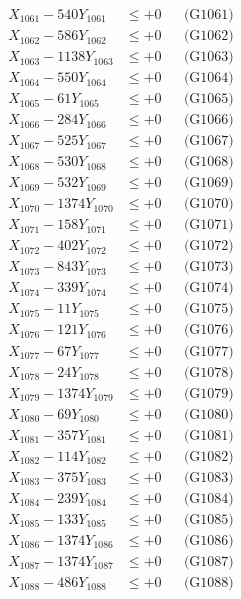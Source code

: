 \documentclass[a4paper,10pt]{article}
\begin{document}
{\begin{align}
\allowbreak
X_{1061} - 540Y_{1061} &\leq +0 && \text{(G1061)} \\
X_{1062} - 586Y_{1062} &\leq +0 && \text{(G1062)} \\
X_{1063} - 1138Y_{1063} &\leq +0 && \text{(G1063)} \\
X_{1064} - 550Y_{1064} &\leq +0 && \text{(G1064)} \\
X_{1065} - 61Y_{1065} &\leq +0 && \text{(G1065)} \\
X_{1066} - 284Y_{1066} &\leq +0 && \text{(G1066)} \\
X_{1067} - 525Y_{1067} &\leq +0 && \text{(G1067)} \\
X_{1068} - 530Y_{1068} &\leq +0 && \text{(G1068)} \\
X_{1069} - 532Y_{1069} &\leq +0 && \text{(G1069)} \\
X_{1070} - 1374Y_{1070} &\leq +0 && \text{(G1070)} \\
\allowbreak
X_{1071} - 158Y_{1071} &\leq +0 && \text{(G1071)} \\
X_{1072} - 402Y_{1072} &\leq +0 && \text{(G1072)} \\
X_{1073} - 843Y_{1073} &\leq +0 && \text{(G1073)} \\
X_{1074} - 339Y_{1074} &\leq +0 && \text{(G1074)} \\
X_{1075} - 11Y_{1075} &\leq +0 && \text{(G1075)} \\
X_{1076} - 121Y_{1076} &\leq +0 && \text{(G1076)} \\
X_{1077} - 67Y_{1077} &\leq +0 && \text{(G1077)} \\
X_{1078} - 24Y_{1078} &\leq +0 && \text{(G1078)} \\
X_{1079} - 1374Y_{1079} &\leq +0 && \text{(G1079)} \\
X_{1080} - 69Y_{1080} &\leq +0 && \text{(G1080)} \\
\allowbreak
X_{1081} - 357Y_{1081} &\leq +0 && \text{(G1081)} \\
X_{1082} - 114Y_{1082} &\leq +0 && \text{(G1082)} \\
X_{1083} - 375Y_{1083} &\leq +0 && \text{(G1083)} \\
X_{1084} - 239Y_{1084} &\leq +0 && \text{(G1084)} \\
X_{1085} - 133Y_{1085} &\leq +0 && \text{(G1085)} \\
X_{1086} - 1374Y_{1086} &\leq +0 && \text{(G1086)} \\
X_{1087} - 1374Y_{1087} &\leq +0 && \text{(G1087)} \\
X_{1088} - 486Y_{1088} &\leq +0 && \text{(G1088)} \\

\end{align}}
\end{document}
